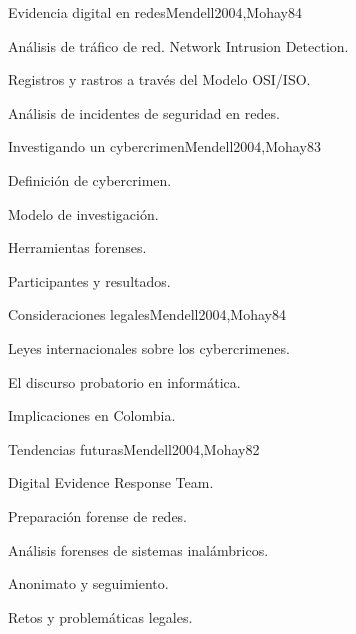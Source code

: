 \begin{syllabus}
\begin{unit}{Evidencia digital en redes}{Mendell2004,Mohay}{8}{4}
\begin{topics}
      \item {Análisis de tráfico de red. Network Intrusion Detection.}
      \item {Registros y rastros a través del Modelo OSI/ISO.}
      \item {Análisis de incidentes de seguridad en redes.}
\end{topics}
\end{unit}

\begin{unit}{Investigando un cybercrimen}{Mendell2004,Mohay}{8}{3}
\begin{topics}
      \item {Definición de cybercrimen.}
      \item {Modelo de investigación.}
      \item {Herramientas forenses.}
      \item {Participantes y resultados.}
\end{topics}
\end{unit}

\begin{unit}{Consideraciones legales}{Mendell2004,Mohay}{8}{4}
\begin{topics}
      \item {Leyes internacionales sobre los cybercrimenes.}
      \item {El discurso probatorio en informática.}
      \item {Implicaciones en Colombia.}
\end{topics}
\end{unit}

\begin{unit}{Tendencias futuras}{Mendell2004,Mohay}{8}{2}
\begin{topics}
      \item {Digital Evidence Response Team.}
      \item {Preparación forense de redes.}
      \item {Análisis forenses de sistemas inalámbricos.}
      \item {Anonimato y seguimiento.}
      \item {Retos y problemáticas legales.}
\end{topics}
\end{unit}

\begin{coursebibliography}
\end{coursebibliography}

\end{syllabus}

%
